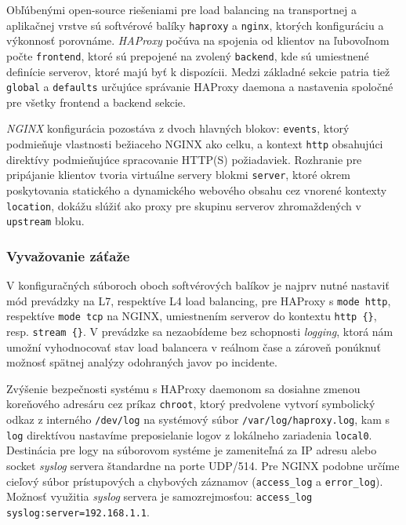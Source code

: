 \documentclass[12pt, a4paper]{article}
\begin{document}
Obľúbenými open-source riešeniami pre load balancing na transportnej a aplikačnej vrstve sú softvérové
balíky \verb|haproxy| a \verb|nginx|, ktorých konfiguráciu a výkonnosť porovnáme. \emph{HAProxy} počúva na 
spojenia od klientov na ľubovoľnom počte \verb|frontend|, ktoré sú prepojené na zvolený \verb|backend|, 
kde sú umiestnené definície serverov, ktoré majú byť k dispozícii. Medzi základné sekcie patria tiež 
\verb|global| a \verb|defaults| určujúce správanie HAProxy daemona a nastavenia spoločné pre všetky
frontend a backend sekcie.

\emph{NGINX} konfigurácia pozostáva z dvoch hlavných blokov: \verb|events|, ktorý podmieňuje vlastnosti
bežiaceho NGINX ako celku, a kontext \verb|http| obsahujúci direktívy podmieňujúce
spracovanie HTTP(S) požiadaviek. Rozhranie pre pripájanie klientov tvoria virtuálne servery blokmi
\verb|server|, ktoré okrem poskytovania statického a dynamického webového obsahu cez vnorené kontexty 
\verb|location|, dokážu slúžiť ako proxy pre skupinu serverov zhromaždených v \verb|upstream| bloku.
 
\subsubsection{Vyvažovanie záťaže}
V konfiguračných súboroch oboch softvérových balíkov je najprv nutné nastaviť mód prevádzky na L7, 
respektíve L4 load balancing, pre HAProxy s \verb|mode http|, respektíve \verb|mode tcp| na NGINX, 
umiestnením serverov do kontextu \verb|http {}|, resp. \verb|stream {}|. V prevádzke sa nezaobídeme bez 
schopnosti \emph{logging}, ktorá nám umožní vyhodnocovať stav load balancera v reálnom čase a zároveň 
ponúknuť možnosť spätnej analýzy odohraných javov po incidente. 

Zvýšenie bezpečnosti systému s HAProxy daemonom sa dosiahne zmenou koreňového adresáru cez príkaz
\verb|chroot|, ktorý predvolene vytvorí symbolický odkaz z interného \verb|/dev/log| na systémový súbor 
\verb|/var/log/haproxy.log|, kam s \verb|log| direktívou nastavíme preposielanie logov z lokálneho 
zariadenia \verb|local0|. Destinácia pre logy na súborovom systéme je zameniteľná za IP adresu alebo  
socket \emph{syslog} servera štandardne na porte UDP/514. Pre NGINX podobne určíme cieľový súbor 
prístupových a chybových záznamov (\verb|access_log| a \verb|error_log|). Možnosť využitia
\emph{syslog} servera je samozrejmosťou: \verb|access_log syslog:server=192.168.1.1|.
\end{document}

